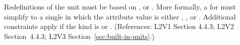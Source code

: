 Redefinitions of the  unit  must be based on
,  or .  More formally, a
\UnitDefinition for  must simplify to a single \Unit in which
the  attribute value is either , , or
.  Additional constraints apply if the kind is
 or .    (References: L2V1 Section 4.4.3; L2V2
Section~4.4.3; L2V3 Section~\ref{sec:built-in-units}.)

